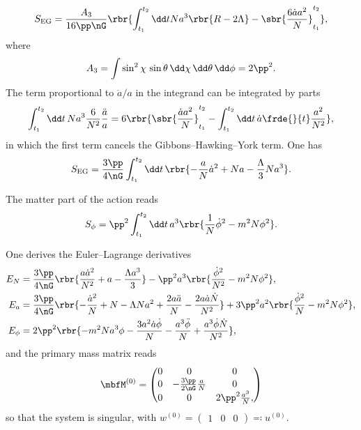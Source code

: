 \documentclass[a4paper,11pt]{article}
\begin{document}
\begin{equation}
S_\text{EG} = \frac{A_3}{16\pp\nG} \rbr{\int_{t_1}^{t_2} \dd t
Na^3\rbr{R - 2\Lambda} - \sbr{\frac{6\dot{a}a^2}{N}}_{t_1}^{t_2}},
\end{equation}
where
\begin{equation}
A_3 = \int \sin^2\chi\,\sin\theta\,\dd\chi\,\dd\theta\,\dd\phi = 2\pp^2.
\end{equation}
The term proportional to $\ddot{a}/a$ in the integrand can be integrated by
parts
\begin{equation}
\int_{t_1}^{t_2} \dd t\,Na^3 \frac{6}{N^2} \frac{\ddot{a}}{a}
= 6\rbr{\sbr{\frac{\dot{a}a^2}{N}}_{t_1}^{t_2} - \int_{t_1}^{t_2}\dd t
\,\dot{a}\frde{}{t}\frac{a^2}{N^2}},
\end{equation}
in which the first term cancels the Gibbons--Hawking--York term. One has
\begin{equation}
S_\text{EG} = \frac{3\pp}{4\nG}\int_{t_1}^{t_2} \dd t\,
\rbr{-\frac{a}{N}\dot{a}^2 + N a - \frac{\Lambda}{3}N a^3}.
\end{equation}

The matter part of the action reads
\begin{equation}
S_\phi = \pp^2 \int_{t_1}^{t_2}\dd t\,
a^3 \rbr{\frac{1}{N}\dot{\phi}^2 - m^2N\phi^2}.
\end{equation}

One derives the Euler--Lagrange derivatives
\begin{align}
E_N &= \frac{3\pp}{4\nG}\rbr{\frac{a\dot{a}^2}{N^2}+a-\frac{\Lambda a^3}{3}}
-\pp^2 a^3 \rbr{\frac{\dot{\phi}^2}{N^2} - m^2 N \phi^2} ,\\
E_a &= \frac{3\pp}{4\nG}\rbr{-\frac{\dot{a}^2}{N}+N-\Lambda Na^2
+\frac{2a\ddot{a}}{N} - \frac{2a\dot{a}\dot{N}}{N^2}}
+3\pp^2a^2\rbr{\frac{\dot{\phi}^2}{N} - m^2 N \phi^2},\\
E_\phi &= 2\pp^2 \rbr{-m^2 N a^3 \phi - \frac{3 a^2 \dot{a}\dot{\phi}}{N}
-\frac{a^3\ddot{\phi}}{N} + \frac{a^3\dot{\phi}\dot{N}}{N^2}},
\end{align}
and the primary mass matrix reads
\begin{equation}
\mbfM^{(0)} = \begin{pmatrix}
0 & 0 & 0 \\ 0 & -\frac{3\pp}{2\nG}\frac{a}{N} & 0 \\
0 & 0 & 2\pp^2\frac{a^3}{N},
\end{pmatrix}
\end{equation}
so that the system is singular, with $w^{(0)} = \begin{pmatrix}
1 & 0 & 0\end{pmatrix} \eqqcolon u^{(0)}$.
\end{document}
